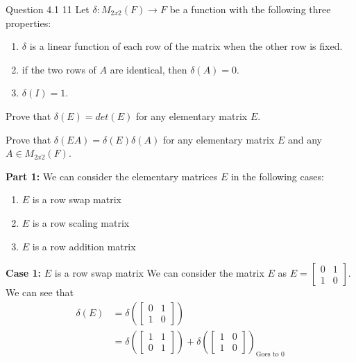 \documentclass[answers,12pt,addpoints]{exam}
\begin{document}
\begin{questions}
\begin{solution}
    \end{solution}
    \item Question 4.1 11
    Let $\delta: M_{2x2}(F) \to F$ be a function with the following three properties:
    \begin{enumerate}
        \item $\delta$ is a linear function of each row of the matrix when the other row is fixed.
        \item if the two rows of $A$ are identical, then $\delta(A) = 0$.
        \item $\delta(I) = 1$.
    \end{enumerate} 
    \begin{parts}
        \item Prove that $\delta(E) = det(E)$ for any elementary matrix $E$.
        \item Prove that $\delta(EA) = \delta(E)\delta(A)$ for any elementary matrix $E$ and any $A \in M_{2x2}(F)$.
    \end{parts}
    \begin{solution}
        \textbf{Part 1:}
        We can consider the elementary matrices $E$ in the following cases:
        \begin{enumerate}
            \item $E$ is a row swap matrix
            \item $E$ is a row scaling matrix
            \item $E$ is a row addition matrix
        \end{enumerate}
        \textbf{Case 1:} $E$ is a row swap matrix
        We can consider the matrix $E$ as $E = \begin{bmatrix} 0 & 1 \\ 1 & 0 \end{bmatrix}$. We can see that 
        \begin{align*}
            \delta(E) &= \delta\left(\begin{bmatrix} 0 & 1 \\ 1 & 0 \end{bmatrix}\right)\\
            &= \delta\left(\begin{bmatrix} 1 & 1 \\ 0 & 1 \end{bmatrix}\right) + \delta\left(\begin{bmatrix} 1 & 0 \\ 1 & 0 \end{bmatrix}\right)_{\text{Goes to } 0}\\

\end{align*}
\end{solution}
\end{questions}
\end{document}
